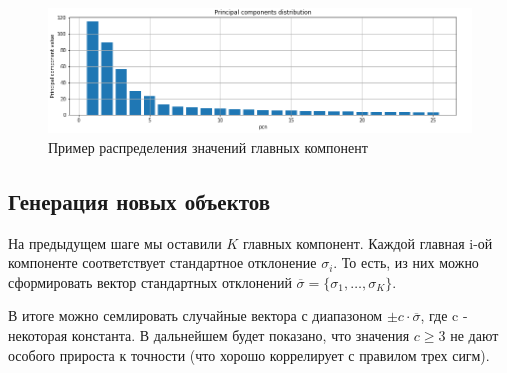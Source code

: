 \begin{figure}[ht!]
    \includegraphics[width=1\linewidth]{images/pcd-example-2.png}
	\caption{Пример распределения значений главных компонент}
    \label{fig:pcd-ex-2}
\end{figure}


\subsection{Генерация новых объектов}

На предыдущем шаге мы оставили $K$ главных компонент. Каждой главная i-ой компоненте соответствует стандартное отклонение $\sigma_{i}$. То есть, из них можно сформировать вектор стандартных отклонений $\overline{\sigma} = \{\sigma_{1}, \dots, \sigma_{K}\}$. 


В итоге можно семлировать случайные вектора с диапазоном $\pm c \cdot \overline{\sigma}$, где c - некоторая константа. В дальнейшем будет показано, что значения $c \ge 3$ не дают особого прироста к точности (что хорошо коррелирует с правилом трех сигм).



